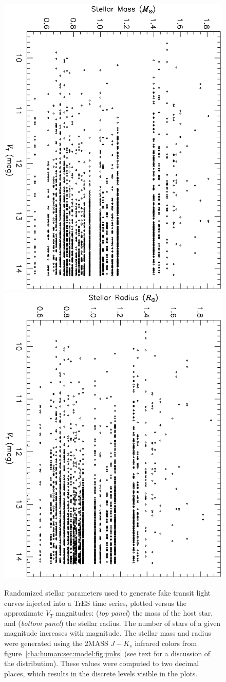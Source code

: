 \begin{figure}
\begin{center}
\centering
\includegraphics[width=.60\textwidth, angle=90]{7_phys_a}\\
\includegraphics[width=.60\textwidth, angle=90]{7_phys_b}\\
\caption[Randomized stellar parameters for injected transits]{%
Randomized stellar parameters used to generate fake transit light curves injected into a TrES time series, plotted versus the approximate $V_{T}$ magnitudes: %
({\it top panel}) the mass of the host star, and %
({\it bottom panel}) the stellar radius.
The number of stars of a given magnitude increases with magnitude.
The stellar mass and radius were generated using the 2MASS $J-K_{s}$ infrared colors from figure~\ref{cha:human:sec:model:fig:jmks} (see text for a discussion of the distribution).
These values were computed to two decimal places, which results in the discrete levels visible in the plots.%
}
\label{cha:human:sec:model:fig:stel}
\end{center}
\end{figure}

